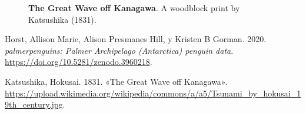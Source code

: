 \documentclass[
  12pt,
  letterpaper,
]{article}
\newlength{\cslhangindent}
\newenvironment{CSLReferences}[2] %
 {\begin{list}{}{%
  \setlength{\itemindent}{0pt}
  \setlength{\leftmargin}{0pt}
  \setlength{\parsep}{0pt}
  \ifodd #1
   \setlength{\leftmargin}{\cslhangindent}
   \setlength{\itemindent}{-1\cslhangindent}
  \fi
  \setlength{\itemsep}{#2\baselineskip}}}
 {\end{list}}
\begin{document}
\begin{figure}[!t]


\caption{\label{fig-img}\textbf{The Great Wave off Kanagawa}. A
woodblock print by Katsushika (1831).}

\end{figure}%

\newpage{}

\label{refs}
\begin{CSLReferences}{1}{0}
Horst, Allison Marie, Alison Presmanes Hill, y Kristen B Gorman. 2020.
\emph{palmerpenguins: Palmer Archipelago (Antarctica) penguin data}.
\url{https://doi.org/10.5281/zenodo.3960218}.

Katsushika, Hokusai. 1831. {«The Great Wave off Kanagawa»}.
\url{https://upload.wikimedia.org/wikipedia/commons/a/a5/Tsunami_by_hokusai_19th_century.jpg}.

\end{CSLReferences}
\end{document}
